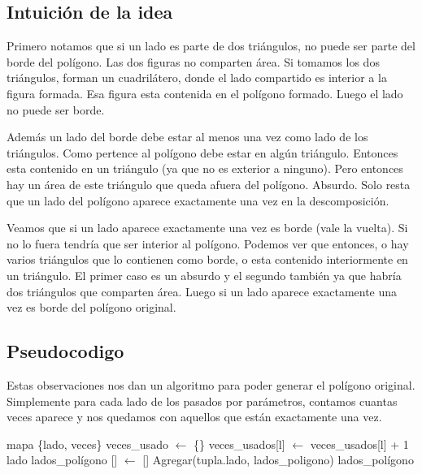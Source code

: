 \subsection{Intuición de la idea}
\par{Primero notamos que si un lado es parte de dos triángulos, no puede ser parte del borde del polígono. Las dos figuras no comparten área. Si tomamos los dos triángulos, forman un cuadrilátero, donde el lado compartido es interior a la figura formada. Esa figura esta contenida en el polígono formado. Luego el lado no puede ser borde.}
\par{Además un lado del borde debe estar al menos una vez como lado de los triángulos. Como pertence al polígono debe estar en algún triángulo. Entonces esta contenido en un triángulo (ya que no es exterior a ninguno). Pero entonces hay un área de este triángulo que queda afuera del polígono. Absurdo. Solo resta que un lado del polígono aparece exactamente una vez en la descomposición.}
\par{Veamos que si un lado aparece exactamente una vez es borde (vale la vuelta). Si no lo fuera tendría que ser interior al polígono. Podemos ver que entonces, o hay varios triángulos que lo contienen como borde, o esta contenido interiormente en un triángulo. El primer caso es un absurdo y el segundo también ya que habría dos triángulos que comparten área. Luego si un lado aparece exactamente una vez es borde del polígono original.}

\subsection{Pseudocodigo}

Estas observaciones nos dan un algoritmo para poder generar el polígono original. Simplemente para cada lado de los pasados por parámetros, contamos cuantas veces aparece y nos quedamos con aquellos que están exactamente una vez. \newline

\begin{algorithmic}

	\State mapa \{lado, veces\} veces_usado $\gets$ \{\}
			\State veces_usados[l] $\gets$ veces_usados[l] + 1
		\EndFor
	\EndFor 
	\State lado lados_polígono [] $\gets$ []
			\State Agregar(tupla.lado, lados_poligono)
		\EndIf
	\EndFor
	\State \Return lados_polígono
\EndFunction

\end{algorithmic}

